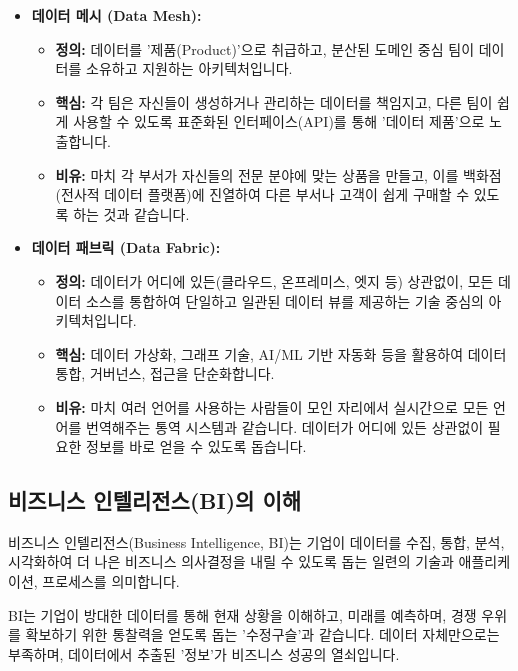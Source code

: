 \documentclass[11pt,a4paper]{article}
\theoremstyle{definition}
\begin{document}
\begin{itemize}
    \item \textbf{데이터 메시 (Data Mesh):}
    \begin{itemize}
        \item \textbf{정의:} 데이터를 '제품(Product)'으로 취급하고, 분산된 도메인 중심 팀이 데이터를 소유하고 지원하는 아키텍처입니다.
        \item \textbf{핵심:} 각 팀은 자신들이 생성하거나 관리하는 데이터를 책임지고, 다른 팀이 쉽게 사용할 수 있도록 표준화된 인터페이스(API)를 통해 '데이터 제품'으로 노출합니다.
        \item \textbf{비유:} 마치 각 부서가 자신들의 전문 분야에 맞는 상품을 만들고, 이를 백화점(전사적 데이터 플랫폼)에 진열하여 다른 부서나 고객이 쉽게 구매할 수 있도록 하는 것과 같습니다.
    \end{itemize}
    \item \textbf{데이터 패브릭 (Data Fabric):}
    \begin{itemize}
        \item \textbf{정의:} 데이터가 어디에 있든(클라우드, 온프레미스, 엣지 등) 상관없이, 모든 데이터 소스를 통합하여 단일하고 일관된 데이터 뷰를 제공하는 기술 중심의 아키텍처입니다.
        \item \textbf{핵심:} 데이터 가상화, 그래프 기술, AI/ML 기반 자동화 등을 활용하여 데이터 통합, 거버넌스, 접근을 단순화합니다.
        \item \textbf{비유:} 마치 여러 언어를 사용하는 사람들이 모인 자리에서 실시간으로 모든 언어를 번역해주는 통역 시스템과 같습니다. 데이터가 어디에 있든 상관없이 필요한 정보를 바로 얻을 수 있도록 돕습니다.
    \end{itemize}
\end{itemize}

\subsection{비즈니스 인텔리전스(BI)의 이해}
비즈니스 인텔리전스(Business Intelligence, BI)는 기업이 데이터를 수집, 통합, 분석, 시각화하여 더 나은 비즈니스 의사결정을 내릴 수 있도록 돕는 일련의 기술과 애플리케이션, 프로세스를 의미합니다.

\begin{summarybox}[title=핵심 요약: 미래를 보는 수정구슬]
BI는 기업이 방대한 데이터를 통해 현재 상황을 이해하고, 미래를 예측하며, 경쟁 우위를 확보하기 위한 통찰력을 얻도록 돕는 '수정구슬'과 같습니다. 데이터 자체만으로는 부족하며, 데이터에서 추출된 '정보'가 비즈니스 성공의 열쇠입니다.
\end{summarybox}
\end{document}
